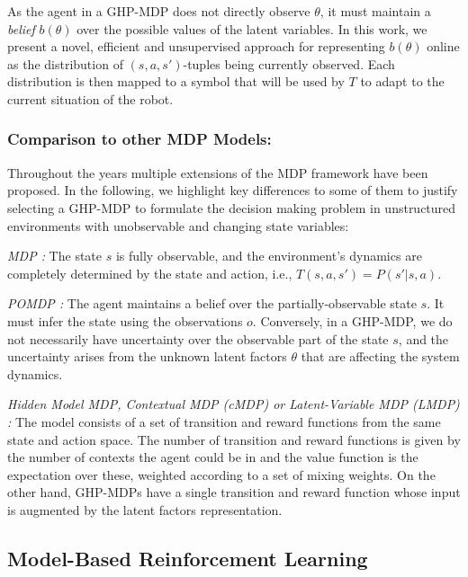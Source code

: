 \documentclass[Afour,sageh,times]{sagej}
\theoremstyle{lemma}
\begin{document}
As the agent in a GHP-MDP does not directly observe \( \theta \), it must maintain a \textit{belief} \( b(\theta) \) over the possible values of the latent variables. In this work, we present a novel, efficient and unsupervised approach for representing $b(\theta)$ online as the distribution of $(s, a, s')$-tuples being currently observed. Each distribution is then mapped to a symbol that will be used by $T$ to adapt to the current situation of the robot.

\subsubsection{Comparison to other MDP Models:}

Throughout the years multiple extensions of the MDP framework have been proposed. In the following, we highlight key differences to some of them to justify selecting a GHP-MDP to formulate the decision making problem in unstructured environments with unobservable and changing state variables:

\textit{MDP \cite[]{bellman1958dynamic}:} The state \( s \) is fully observable, and the environment’s dynamics are completely determined by the state and action, i.e., \( T(s, a, s') = P(s' | s, a) \).

\textit{POMDP \cite[]{aastrom1965optimal, kaelbling1998planning}:} The agent maintains a belief over the partially-observable state $s$. It must infer the state using the observations \( o \). Conversely, in a GHP-MDP, we do not necessarily have uncertainty over the observable part of the state \( s \), and the uncertainty arises from the unknown latent factors \( \theta \) that are affecting the system dynamics. %

\textit{Hidden Model MDP, Contextual MDP (cMDP) or Latent-Variable MDP (LMDP) \cite[]{chades2012momdps, hallak2015contextual, kwon2021rl, steimle2021multi}:} The model consists of a set of transition and reward functions from the same state and action space. The number of transition and reward functions is given by the number of contexts the agent could be in and the value function is the expectation over these, weighted according to a set of mixing weights. On the other hand, GHP-MDPs have a single transition and reward function whose input is augmented by the latent factors representation.

\subsection{Model-Based Reinforcement Learning} \label{sec:appendix-mbrl}
\end{document}

